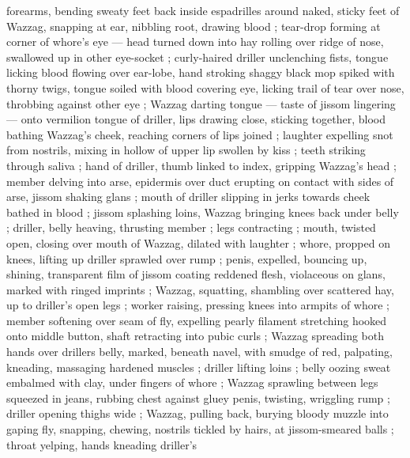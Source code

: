 forearms, bending sweaty feet back inside espadrilles around naked, sticky feet of Wazzag, snapping at ear, nibbling root, drawing blood ; tear-drop forming at corner of whore's eye --- head turned down into hay {\dashcom} rolling over ridge of nose, swallowed up in other eye-socket ; curly-haired driller unclenching fists, tongue licking blood flowing over ear-lobe, hand stroking shaggy black mop spiked with thorny twigs, tongue soiled with blood covering eye, licking trail of tear over nose, throbbing against other eye ; Wazzag darting tongue --- taste of jissom lingering --- onto vermilion tongue of driller, lips drawing close, sticking together, blood bathing Wazzag's cheek, reaching corners of lips joined ; laughter expelling snot from nostrils, mixing in hollow of upper lip swollen by kiss ; teeth striking through saliva ; hand of driller, thumb linked to index, gripping Wazzag's head ; member delving into arse, epidermis over duct erupting on contact with sides of arse, jissom shaking glans ; mouth of driller slipping in jerks towards cheek bathed in blood ; jissom splashing loins, Wazzag bringing knees back under belly ; driller, belly heaving, thrusting member ; legs contracting ; mouth, twisted open, closing over mouth of Wazzag, dilated with laughter ; whore, propped on knees, lifting up driller sprawled over rump ; penis, expelled, bouncing up, shining, transparent film of jissom coating reddened flesh, violaceous on glans, marked with ringed imprints ; Wazzag, squatting, shambling over scattered hay, up to driller's open legs ; worker raising, pressing knees into armpits of whore ; member softening over seam of fly, expelling pearly filament stretching hooked onto middle button, shaft retracting into pubic curls ; Wazzag spreading both hands over drillers belly, marked, beneath navel, with smudge of red, palpating, kneading, massaging hardened muscles ; driller lifting loins ; belly oozing sweat embalmed with clay, under fingers of whore ; Wazzag sprawling between legs squeezed in jeans, rubbing chest against gluey penis, twisting, wriggling rump ; driller opening thighs wide ; Wazzag, pulling back, burying bloody muzzle into gaping fly, snapping, chewing, nostrils tickled by hairs, at jissom-smeared balls ; throat yelping, hands kneading driller's 
